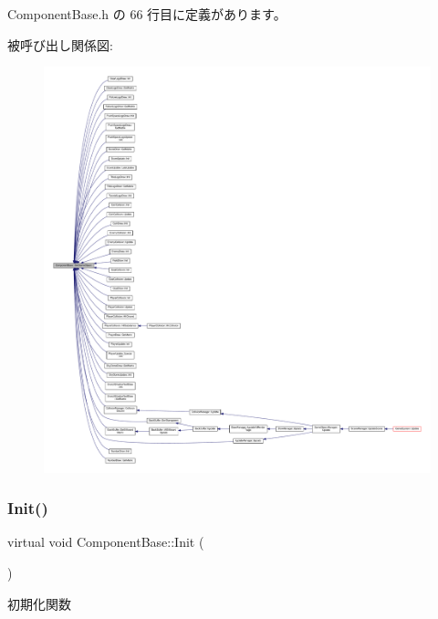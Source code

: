  Component\+Base.\+h の 66 行目に定義があります。

被呼び出し関係図\+:
\nopagebreak
\begin{figure}[H]
\begin{center}
\leavevmode
\includegraphics[width=350pt]{class_component_base_a0ac0d71aeeb768401f34a2e780b1e25d_icgraph}
\end{center}
\end{figure}
\mbox{\label{class_component_base_a125939d6befe42f28886a6523e86b18b}} 
\subsubsection{\texorpdfstring{Init()}{Init()}}
{\footnotesize\ttfamily virtual void Component\+Base\+::\+Init (\begin{DoxyParamCaption}{ }\end{DoxyParamCaption})\hspace{0.3cm}{\ttfamily [pure virtual]}}



初期化関数 



